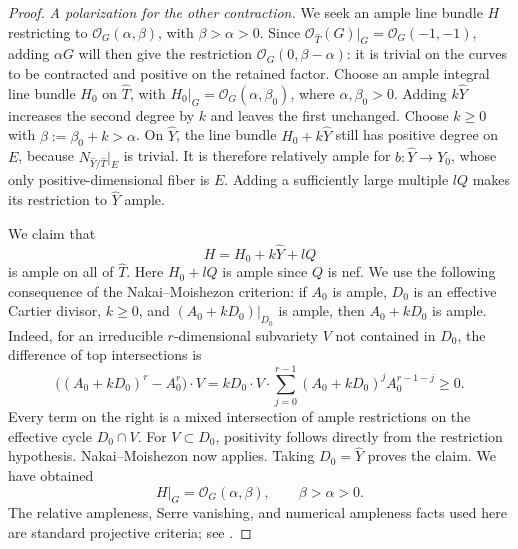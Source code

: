 \documentclass[11pt,reqno]{amsart}
\numberwithin{equation}{section}
\theoremstyle{definition}
\theoremstyle{remark}
\begin{document}
\begin{proof}
\smallskip
\noindent\emph{A polarization for the other contraction.}
We seek an ample line bundle $H$ restricting to
$\mathcal O_G(\alpha,\beta)$, with $\beta>\alpha>0$.
Since $\mathcal O_{\widehat T}(G)|_G=\mathcal O_G(-1,-1)$,
adding $\alpha G$ will then give the restriction
$\mathcal O_G(0,\beta-\alpha)$: it is trivial on the curves to be
contracted and positive on the retained factor.
Choose an ample integral line bundle $H_0$ on $\widehat T$, with
$H_0|_G=\mathcal O_G(\alpha,\beta_0)$, where $\alpha,\beta_0>0$.
Adding $k\widehat Y$ increases the second degree by $k$ and leaves the
first unchanged.  Choose $k\ge0$ with $\beta:=\beta_0+k>\alpha$.
On $\widehat Y$, the line bundle $H_0+k\widehat Y$ still has positive
degree on $E$, because $N_{\widehat Y/\widehat T}|_E$ is trivial.
It is therefore relatively ample for $b:\widehat Y\to Y_0$, whose
only positive-dimensional fiber is $E$.  Adding a sufficiently large
multiple $lQ$ makes its restriction to $\widehat Y$ ample.

We claim that
\[
 H=H_0+k\widehat Y+lQ
\]
is ample on all of $\widehat T$.  Here $H_0+lQ$ is ample since $Q$
is nef.  We use the following consequence of the Nakai--Moishezon
criterion: if $A_0$ is ample, $D_0$ is an effective Cartier divisor,
$k\ge0$, and $(A_0+kD_0)|_{D_0}$ is ample, then $A_0+kD_0$ is ample.
Indeed, for an irreducible $r$-dimensional subvariety $V$ not contained
in $D_0$, the difference of top intersections is
\[
 \bigl((A_0+kD_0)^r-A_0^r\bigr)\cdot V
 = kD_0\cdot V\cdot
   \sum_{j=0}^{r-1}(A_0+kD_0)^j A_0^{r-1-j}\ge0.
\]
Every term on the right is a mixed intersection of ample restrictions
on the effective cycle $D_0\cap V$.  For $V\subset D_0$, positivity
follows directly from the restriction hypothesis.  Nakai--Moishezon
now applies.  Taking $D_0=\widehat Y$ proves the claim.  We have obtained
\begin{equation}\label{proj:ample-degrees}
 H|_G=\mathcal O_G(\alpha,\beta),\qquad \beta>\alpha>0.
\end{equation}
The relative ampleness, Serre vanishing, and numerical ampleness facts
used here are standard projective criteria; see \cite{Hartshorne}.


\end{proof}
\end{document}
